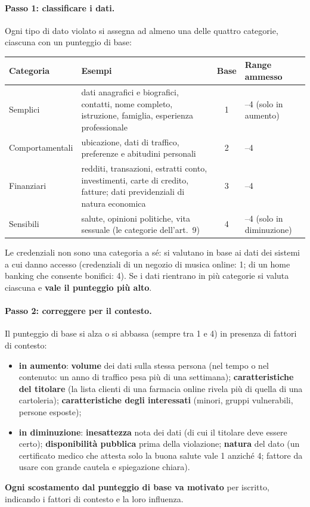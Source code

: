 \paragraph{Passo 1: classificare i dati.} Ogni tipo di dato violato si assegna ad almeno una delle quattro
categorie, ciascuna con un punteggio di base:
\begin{center}
\small
\begin{tabularx}{\linewidth}{>{\raggedright\arraybackslash}p{2.6cm} X c >{\raggedright\arraybackslash}p{2.2cm}}
\toprule
\textbf{Categoria} & \textbf{Esempi} & \textbf{Base} & \textbf{Range ammesso}\\
\midrule
Semplici & dati anagrafici e biografici, contatti, nome completo, istruzione, famiglia, esperienza
  professionale & 1 & 1--4 (solo in aumento)\\
Comportamentali & ubicazione, dati di traffico, preferenze e abitudini personali & 2 & 1--4\\
Finanziari & redditi, transazioni, estratti conto, investimenti, carte di credito, fatture; dati
  previdenziali di natura economica & 3 & 1--4\\
Sensibili & salute, opinioni politiche, vita sessuale (le categorie dell'art.~9) & 4 & 1--4 (solo in
  diminuzione)\\
\bottomrule
\end{tabularx}
\end{center}
Le credenziali non sono una categoria a sé: si valutano in base ai dati dei sistemi a cui danno accesso
(credenziali di un negozio di musica online: 1; di un home banking che consente bonifici: 4). Se i dati
rientrano in più categorie si valuta ciascuna e \textbf{vale il punteggio più alto}.

\paragraph{Passo 2: correggere per il contesto.} Il punteggio di base si alza o si abbassa (sempre tra
1 e 4) in presenza di fattori di contesto:
\begin{itemize}
  \item \textbf{in aumento}: \textbf{volume} dei dati sulla stessa persona (nel tempo o nel contenuto: un
    anno di traffico pesa più di una settimana); \textbf{caratteristiche del titolare} (la lista clienti di
    una farmacia online rivela più di quella di una cartoleria); \textbf{caratteristiche degli
    interessati} (minori, gruppi vulnerabili, persone esposte);
  \item \textbf{in diminuzione}: \textbf{inesattezza} nota dei dati (di cui il titolare deve essere
    certo); \textbf{disponibilità pubblica} prima della violazione; \textbf{natura} del dato (un
    certificato medico che attesta solo la buona salute vale 1 anziché 4; fattore da usare con grande
    cautela e spiegazione chiara).
\end{itemize}
\textbf{Ogni scostamento dal punteggio di base va motivato} per iscritto, indicando i fattori di contesto e
la loro influenza.

